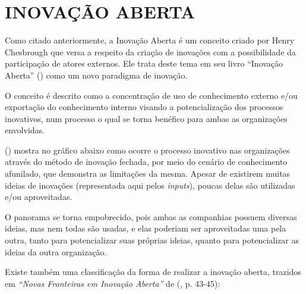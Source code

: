 \section {INOVAÇÃO ABERTA}
\label{inovacaoaberta}

Como citado anteriormente, a Inovação Aberta é um  conceito criado por Henry Chesbrough que versa a respeito da criação de inovações com a possibilidade da participação de atores externos. Ele trata deste tema em seu livro “Inovação Aberta” (\citeyear{chesbrough2003}) como um novo paradigma de inovação.

O conceito é descrito como a concentração de uso de conhecimento externo e/ou exportação do conhecimento interno visando a potencialização dos processos inovativos, num processo o qual se torna benéfico para ambas as organizações envolvidas.

\citeauthor{chesbrough2003} (\citeyear{chesbrough2003}) mostra no gráfico abaixo como ocorre o processo inovativo nas organizações através do método de inovação fechada, por meio do cenário de conhecimento afunilado, que demonstra as limitações da mesma. Apesar de existirem muitas ideias de inovações (representada aqui pelos \textit{inputs}), poucas delas são utilizadas e/ou aproveitadas.

O panorama se torna empobrecido, pois ambas as companhias possuem diversas ideias, mas nem todas são usadas, e elas poderiam ser aproveitadas uma pela outra, tanto para potencializar suas próprias ideias, quanto para potencializar as ideias da outra organização.



Existe também uma classificação da forma de realizar a inovação aberta, trazidos em \textit{“Novas Fronteiras em Inovação Aberta”} de \citeauthor{chesbrough2014} (\citeyear{chesbrough2014}, p. 43-45):




